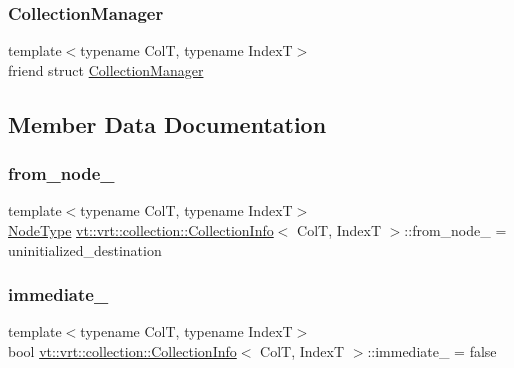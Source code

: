 \subsubsection{\texorpdfstring{Collection\+Manager}{CollectionManager}}
{\footnotesize\ttfamily template$<$typename ColT, typename IndexT$>$ \\
friend struct \hyperlink{structvt_1_1vrt_1_1collection_1_1_collection_manager}{Collection\+Manager}\hspace{0.3cm}{\ttfamily [friend]}}



\subsection{Member Data Documentation}
\mbox{\label{structvt_1_1vrt_1_1collection_1_1_collection_info_a16213a751f7753963ab2671ecab931d3}} 
\subsubsection{\texorpdfstring{from\+\_\+node\+\_\+}{from\_node\_}}
{\footnotesize\ttfamily template$<$typename ColT, typename IndexT$>$ \\
\hyperlink{namespacevt_a866da9d0efc19c0a1ce79e9e492f47e2}{Node\+Type} \hyperlink{structvt_1_1vrt_1_1collection_1_1_collection_info}{vt\+::vrt\+::collection\+::\+Collection\+Info}$<$ ColT, IndexT $>$\+::from\+\_\+node\+\_\+ = uninitialized\+\_\+destination\hspace{0.3cm}{\ttfamily [private]}}

\mbox{\label{structvt_1_1vrt_1_1collection_1_1_collection_info_abee4e28cb909a7e5996274f916138c5e}} 
\subsubsection{\texorpdfstring{immediate\+\_\+}{immediate\_}}
{\footnotesize\ttfamily template$<$typename ColT, typename IndexT$>$ \\
bool \hyperlink{structvt_1_1vrt_1_1collection_1_1_collection_info}{vt\+::vrt\+::collection\+::\+Collection\+Info}$<$ ColT, IndexT $>$\+::immediate\+\_\+ = false\hspace{0.3cm}{\ttfamily [private]}}

